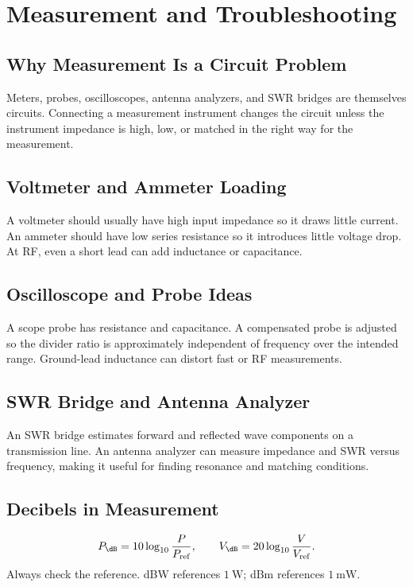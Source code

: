 \chapter{Measurement and Troubleshooting}
\label{ch:measurement}
\section{Why Measurement Is a Circuit Problem}
Meters, probes, oscilloscopes, antenna analyzers, and SWR bridges are themselves
circuits. Connecting a measurement instrument changes the circuit unless the
instrument impedance is high, low, or matched in the right way for the
measurement.

\section{Voltmeter and Ammeter Loading}
A voltmeter should usually have high input impedance so it draws little current.
An ammeter should have low series resistance so it introduces little voltage
drop. At RF, even a short lead can add inductance or capacitance.

\section{Oscilloscope and Probe Ideas}
A scope probe has resistance and capacitance. A compensated probe is adjusted so
the divider ratio is approximately independent of frequency over the intended
range. Ground-lead inductance can distort fast or RF measurements.

\section{SWR Bridge and Antenna Analyzer}
An SWR bridge estimates forward and reflected wave components on a transmission
line. An antenna analyzer can measure impedance and SWR versus frequency, making
it useful for finding resonance and matching conditions.

\section{Decibels in Measurement}
\[
P_{\dB}=10\log_{10}\frac{P}{P_{\mathrm{ref}}},
\qquad
V_{\dB}=20\log_{10}\frac{V}{V_{\mathrm{ref}}}.
\]
Always check the reference. dBW references \(\SI{1}{\watt}\); dBm references
\(\SI{1}{\milli\watt}\).

